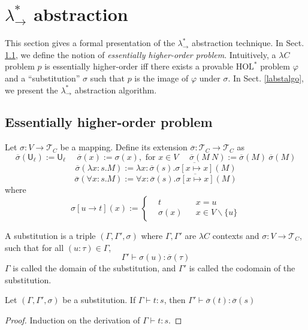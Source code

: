 \section{$\lambda_\to^*$ abstraction}\label{sectabst}

This section gives a formal presentation of the $\lambda_\to^*$ abstraction technique.
In Sect. \ref{fmehop}, we define the notion of \textit{essentially higher-order problem}.
Intuitively, a $\lambda C$ problem $p$ is essentially higher-order iff there exists
a provable $\text{HOL}^*$ problem $\varphi$ and a ``substitution'' $\sigma$ such that $p$ is the
image of $\varphi$ under $\sigma$. In Sect. \ref{labstalgo}, we present the
$\lambda_\to^*$ abstraction algorithm.

\subsection{Essentially higher-order problem}\label{fmehop}

\begin{definition} Let $\sigma : V \to \mathcal{T}_C$ be a mapping.
  Define its extension $\overline{\sigma} : \mathcal{T}_C \to \mathcal{T}_C$ as
  $$\overline{\sigma}(\mathsf{U}_\ell) := \mathsf{U}_\ell \ \ \ \ \ \
    \overline{\sigma}(x) := \sigma(x), \text{ for }x \in V \ \ \ \ \ \
    \overline{\sigma}(M \ N) := \overline{\sigma}(M) \ \overline{\sigma}(M)$$
  $$\overline{\sigma}(\lambda x : s. M) := \lambda x : \overline{\sigma}(s). \overline{\sigma[x \mapsto x]}(M)$$
  $$\overline{\sigma}(\forall x : s. M) := \forall x : \overline{\sigma}(s). \overline{\sigma[x \mapsto x]}(M)$$
  where
  $$\sigma[u \to t](x) := \left\{\begin{aligned}
    & t & & x = u \\
    & \sigma(x) & & x \in V \backslash \{u\}
  \end{aligned}\right.$$
\end{definition}

\begin{definition} A substitution is a triple $(\Gamma, \Gamma', \sigma)$ where $\Gamma, \Gamma'$ are $\lambda C$ contexts
  and $\sigma : V \to \mathcal{T}_C$, such that for all $(u : \tau) \in \Gamma$,
  $$\Gamma' \vdash \sigma(u) : \overline{\sigma}(\tau)$$
  $\Gamma$ is called the domain of the substitution, and $\Gamma'$ is called the codomain of the substitution.
\end{definition}

\begin{theorem}
  Let $(\Gamma, \Gamma', \sigma)$ be a substitution. If $\Gamma \vdash t : s$, then $\Gamma' \vdash \overline{\sigma}(t) : \overline{\sigma}(s)$
\end{theorem}
\begin{proof} Induction on the derivation of $\Gamma \vdash t : s$.
\end{proof}

